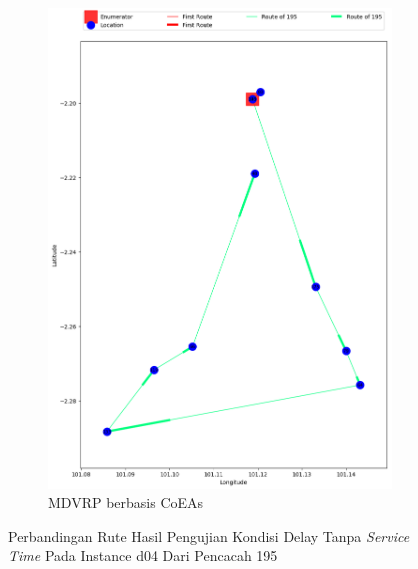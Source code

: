 \begin{figure}[H]
	\centering
	\begin{subfigure}[t]{\textwidth}
		\centering
		\includegraphics[width=\textwidth]{Resources/Images/delayed_5/real_m15_n100_delayed_5_195_coes}
		\caption{MDVRP berbasis CoEAs}
		\label{fig:real_m15_n100_delayed_5_195_coes}
	\end{subfigure}
	\caption{Perbandingan Rute Hasil Pengujian Kondisi Delay Tanpa \textit{Service Time} Pada Instance d04 Dari Pencacah 195}
	\label{fig:real_m15_n100_delayed_5_195}
\end{figure}


